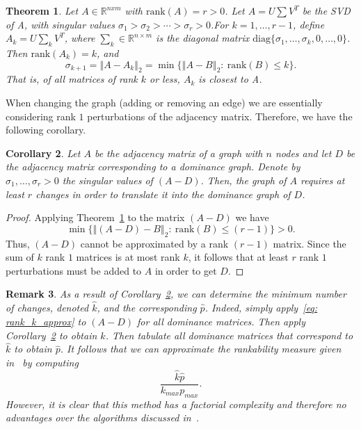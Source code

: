 \documentclass{article}
\newtheorem{theorem}{Theorem}[section]
\newtheorem{corollary}[theorem]{Corollary}
\newtheorem{remark}[theorem]{Remark}
\begin{document}
\begin{theorem}\label{thm: rank_k_approx}
Let $A\in\mathbb{R}^{nxm}$ with $\text{rank}(A)=r>0$. Let $A = U\sum V^{T}$ be the SVD of A, with singular values $\sigma_{1}>\sigma_{2}>\cdots>\sigma_{r}>0$.For $k=1,\ldots,r-1$, define $A_{k} = U\sum_{k}V^{T}$, where $\sum_{k}\in\mathbb{R}^{n\times m}$
is the diagonal matrix $\text{diag}\{\sigma_{1},\ldots,\sigma_{k},0,\ldots,0\}$. Then $\text{rank}(A_{k}) = k$, and
\begin{equation}\label{eq: rank_k_approx}
\sigma_{k+1}=\left\Vert A-A_{k}\right\Vert_{2}=\min\{\left\Vert A-B\right\Vert_{2}\colon~\text{rank}(B)\leq k\}.
\end{equation}
That is, of all matrices of rank $k$ or less, $A_{k}$ is closest to A.
\end{theorem}

When changing the graph (adding or removing an edge) we are essentially considering rank $1$ perturbations of the adjacency matrix. 
Therefore, we have the following corollary.

\begin{corollary}\label{cor: rank_k_approx}
Let $A$ be the adjacency matrix of a graph with $n$ nodes and let $D$ be the adjacency matrix corresponding to a dominance graph. 
Denote by $\sigma_{1},\ldots,\sigma_{r}>0$ the singular values of $(A-D)$. Then, the graph of $A$ requires at least $r$ changes in order to translate it into the dominance graph of $D$.
\end{corollary}
\begin{proof}
Applying Theorem~\ref{thm: rank_k_approx} to the matrix $(A-D)$ we have
\[
\min\{\left\Vert (A-D)-B\right\Vert_{2}\colon~\text{rank}(B)\leq (r-1)\}>0.
\]
Thus, $(A-D)$ cannot be approximated by a rank $(r-1)$ matrix. 
Since the sum of $k$ rank $1$ matrices is at most rank $k$, it follows that at least $r$ rank $1$ perturbations must be added to $A$ in order to get $D$.
\end{proof}

\begin{remark}
As a result of Corollary~\ref{cor: rank_k_approx}, we can determine the minimum number of changes, denoted $\hat{k}$, and the corresponding $\hat{p}$.
Indeed, simply apply~\eqref{eq: rank_k_approx} to $(A-D)$ for all dominance matrices. Then apply Corollary~\ref{cor: rank_k_approx} to obtain $\hat{k}$.
Then tabulate all dominance matrices that correspond to $\hat{k}$ to obtain $\hat{p}$.
It follows that we can approximate the rankability measure given in~\cite{Anderson} by computing
\begin{equation}\label{eq: rank_meas_approx}
\frac{\hat{k}\hat{p}}{k_{max}p_{max}}.
\end{equation}
However, it is clear that this method has a factorial complexity and therefore no advantages over the algorithms discussed in~\cite{Anderson}.
\end{remark}
\end{document}
